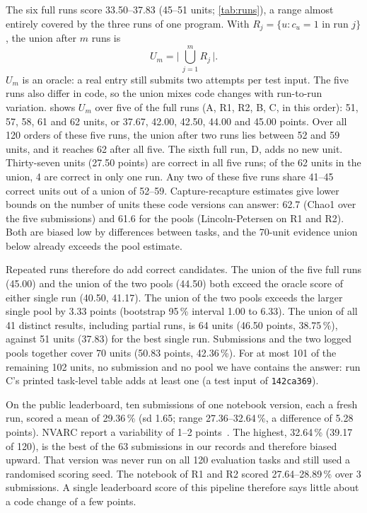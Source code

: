 \documentclass[11pt]{article}
\newcommand{\code}[1]{\texttt{#1}}
\newcommand{\R}[1]{R#1}
\begin{document}
The six full runs score 33.50--37.83 (45--51 units; \cref{tab:runs}), a range almost entirely covered by the three runs of one program. With $R_j = \{u : c_u = 1 \text{ in run } j\}$, the union after $m$ runs is
\begin{equation}
\label{eq:union}
U_m = \Big|\, \bigcup_{j=1}^{m} R_j \,\Big| .
\end{equation}
$U_m$ is an oracle: a real entry still submits two attempts per test input. The five runs also differ in code, so the union mixes code changes with run-to-run variation.
 shows $U_m$ over five of the full runs (A, \R{1}, \R{2}, B, C, in this order): 51, 57, 58, 61 and 62 units, or 37.67, 42.00, 42.50, 44.00 and 45.00 points.
Over all 120 orders of these five runs, the union after two runs lies between 52 and 59 units, and it reaches 62 after all five. The sixth full run, D, adds no new unit.
Thirty-seven units (27.50 points) are correct in all five runs; of the 62 units in the union, 4 are correct in only one run. Any two of these five runs share 41--45 correct units out of a union of 52--59.
Capture-recapture estimates give lower bounds on the number of units these code versions can answer: 62.7 (Chao1 over the five submissions) and 61.6 for the pools (Lincoln-Petersen on \R{1} and \R{2}). Both are biased low by differences between tasks, and the 70-unit evidence union below already exceeds the pool estimate.

Repeated runs therefore do add correct candidates. The union of the five full runs (45.00) and the union of the two pools (44.50) both exceed the oracle score of either single run (40.50, 41.17). The union of the two pools exceeds the larger single pool by 3.33 points (bootstrap 95\,\% interval 1.00 to 6.33).
The union of all 41 distinct results, including partial runs, is 64 units (46.50 points, 38.75\,\%), against 51 units (37.83) for the best single run.
Submissions and the two logged pools together cover 70 units (50.83 points, 42.36\,\%). For at most 101 of the remaining 102 units, no submission and no pool we have contains the answer: run C's printed task-level table adds at least one (a test input of \code{142ca369}).

On the public leaderboard, ten submissions of one notebook version, each a fresh run, scored a mean of 29.36\,\% (sd 1.65; range 27.36--32.64\,\%, a difference of 5.28 points). NVARC report a variability of 1--2 points~\citep{nvarc2025}. The highest, 32.64\,\% (39.17 of 120), is the best of the 63 submissions in our records and therefore biased upward. That version was never run on all 120 evaluation tasks and still used a randomised scoring seed. The notebook of \R{1} and \R{2} scored 27.64--28.89\,\% over 3 submissions.
A single leaderboard score of this pipeline therefore says little about a code change of a few points.
\end{document}
